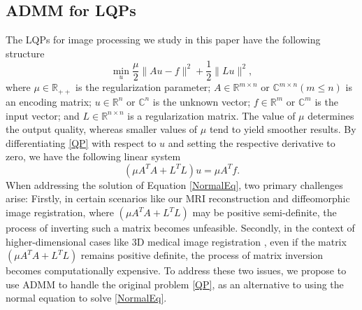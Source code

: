 \documentclass[letterpaper]{article} %
\begin{document}
\subsection{ADMM for LQPs} 
The LQPs for image processing we study in this paper have the following structure
\begin{equation}\label{QP}
	\min\limits_{u}\frac{\mu}{2}\|Au-f\|^2+\frac{1}{2}\|L u\|^2,
\end{equation}
where $\mu\in\mathbb{R}_{++}$ is the regularization parameter; $A\in \mathbb{R}^{m\times n}$ or $\mathbb{C}^{m\times n} \left(m \leq n\right)$ is an encoding matrix; $u\in \mathbb{R}^{n}$ or  $\mathbb{C}^{n}$ is the unknown vector; $f\in \mathbb{R}^{m}$ or $\mathbb{C}^{m} $ is the input vector; and $L\in \mathbb{R}^{n\times n}$ is a regularization matrix. The value of $\mu$ determines the output quality, whereas smaller values of $\mu$ tend to yield smoother results. By differentiating \eqref{QP} with respect to $u$ and setting the respective derivative to zero, we have the following linear system
\begin{equation}\label{NormalEq}
	\left(\mu A^TA + L^TL\right) u = \mu A^T f.
\end{equation}
When addressing the solution of Equation \eqref{NormalEq}, two primary challenges arise: Firstly, in certain scenarios like our MRI reconstruction and diffeomorphic image registration, where $\left(\mu A^TA + L^TL\right)$ may be positive semi-definite, the process of inverting such a matrix becomes unfeasible. Secondly, in the context of higher-dimensional cases like 3D medical image registration \cite{thorley2021nesterov}, even if the matrix $\left(\mu A^TA + L^TL\right)$ remains positive definite, the process of matrix inversion becomes computationally expensive. To address these two issues, we propose to use ADMM to handle the original problem \eqref{QP}, as an alternative to using the normal equation to solve \eqref{NormalEq}.
\end{document}
